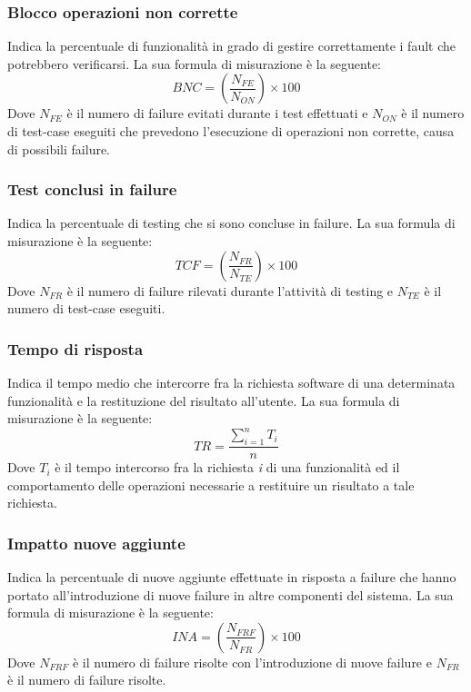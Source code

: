 		\subsubsection{Blocco operazioni non corrette} Indica la percentuale di funzionalità in grado di gestire correttamente i fault che
potrebbero verificarsi. La sua formula di misurazione è la seguente:
\newline
		\[
		BNC=(\frac{N_{FE}}{N_{ON}}) \times 100
		\]	
		Dove $N_{FE}$ è il numero di failure evitati durante i test effettuati e $N_{ON}$ è il numero
di test-case eseguiti che prevedono l’esecuzione di operazioni non corrette, causa
		di possibili failure.
		\subsubsection{Test conclusi in failure} Indica la percentuale di testing che si sono concluse in failure. La sua formula di
misurazione è la seguente:
 \newline
		\[
		TCF=(\frac{N_{FR}}{N_{TE}}) \times 100
		\]	
		Dove $N_{FR}$ è il numero di failure rilevati durante l'attività di testing e $N_{TE}$
è il numero di test-case eseguiti.
		\subsubsection{Tempo di risposta} Indica il tempo medio che intercorre fra la richiesta software di una determinata
funzionalità e la restituzione del risultato all’utente. La sua formula di misurazione
è la seguente:\newline
		\[
		TR=\frac{\sum_{i=1}^{n}T_i}{n}
		\]	
		Dove $T_i$ è il tempo intercorso fra la richiesta \textit{i} di una funzionalità ed il comportamento delle operazioni necessarie a restituire un risultato a tale richiesta.
		\subsubsection{Impatto nuove aggiunte} Indica la percentuale di nuove aggiunte effettuate in risposta a failure che hanno portato
all’introduzione di nuove failure in altre componenti del sistema. La sua formula
		di misurazione è la seguente:
\newline
		\[
		INA=(\frac{N_{FRF}}{N_{FR}}) \times 100
		\]
		Dove $N_{FRF}$ è il numero di failure risolte con l’introduzione di nuove failure e $N_{FR}$
		è il numero di failure risolte.
	